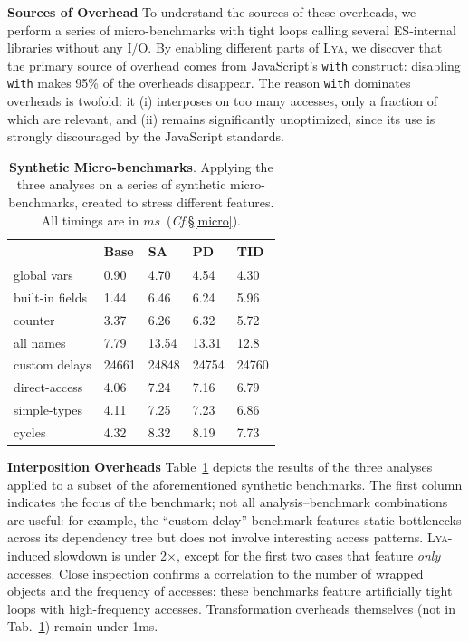 \documentclass[letterpaper,twocolumn,10pt]{article}
\newcommand{\heading}[1]{\vspace{2pt}\noindent\textbf{#1}\enspace}
\newcommand{\ttt}[1]{\texttt{#1}}
\newcommand{\cf}[1]{(\emph{Cf}.\S\ref{#1})}
\newcommand{\sys}{{\scshape Lya}\xspace}
\begin{document}
\heading{Sources of Overhead}
To understand the sources of these overheads, we perform a series of micro-benchmarks with tight loops calling several ES-internal libraries without any I/O.
By enabling different parts of \sys, we discover that the primary source of overhead comes from JavaScript's \ttt{with} construct:
  disabling \ttt{with} makes 95\% of the overheads disappear.
The reason \ttt{with} dominates overheads is twofold: it (i) interposes on too many accesses, only a fraction of which are relevant, and (ii) remains significantly unoptimized, since its use is strongly discouraged by the JavaScript standards.


\begin{table}[t]
\center
\footnotesize
\setlength\tabcolsep{3pt}
\caption{
  \footnotesize{
    \textbf{Synthetic Micro-benchmarks}.
		Applying the three analyses on a series of synthetic micro-benchmarks, created to stress different features.
    All timings are in $ms$~\cf{micro}.
  }
}
\begin{tabular*}{\columnwidth}{l @{\extracolsep{\fill}} lll l}
\toprule
	               &   Base    &  SA     & PD      &  TID    \\
\midrule
global  vars     &   0.90    &  4.70   &  4.54   &  4.30   \\
built-in fields  &   1.44    &  6.46   &  6.24   &  5.96   \\
counter          &   3.37    &  6.26   &  6.32   &  5.72   \\
all names        &   7.79    &  13.54  &  13.31  &  12.8   \\
custom delays    &   24661   &  24848  &  24754  &  24760  \\
direct-access    &   4.06    &  7.24   &  7.16   &  6.79   \\
simple-types     &   4.11    &  7.25   &  7.23   &  6.86   \\
cycles           &   4.32    &  8.32   &  8.19   &  7.73   \\
\bottomrule
\end{tabular*}
\label{tab:synthetic}
\vspace{-5mm}
\end{table}


\heading{Interposition Overheads}
Table~\ref{tab:synthetic} depicts the results of the three analyses applied to a subset of the aforementioned synthetic benchmarks.
The first column indicates the focus of the benchmark; not all analysis--benchmark combinations are useful:
  for example, the ``custom-delay'' benchmark features static bottlenecks across its dependency tree but does not involve interesting access patterns.
\sys-induced slowdown is under 2$\times$, except for the first two cases that feature \emph{only} accesses.
Close inspection confirms a correlation to the number of wrapped objects and the frequency of accesses:
  these benchmarks feature artificially tight loops with high-frequency accesses.
Transformation overheads themselves (not in Tab.~\ref{tab:synthetic}) remain under 1ms.
\end{document}
